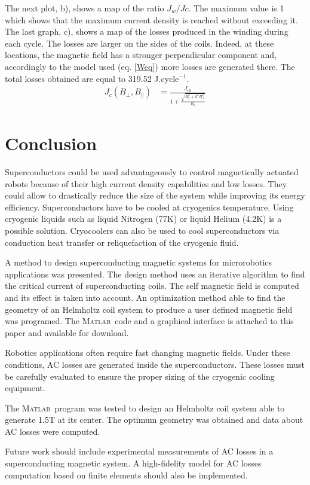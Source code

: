 \documentclass{ws-jmrr}
\newcommand{\MATLAB}{\textsc{Matlab}}
\begin{document}
\begin{multicols}{2}
\begin{figurehere}
\begin{center}
	\label{Results}
	\vspace{-0.5cm}
	\caption{Results from the geometric optimization of a superconducting Helmhotz coil system using the \MATLAB ~program provided with this paper.}
	\end{center}
\end{figurehere}
\vspace{-0.5cm}
The next plot, b), shows a map of the ratio $J_w/Jc$. The maximum value is 1 which shows that the maximum current density is reached without exceeding it. The last graph, c), shows a map of the losses produced in the winding during each cycle. The losses are larger on the sides of the coils. Indeed, at these locations, the magnetic field has a stronger perpendicular component and, accordingly to the model used (eq. \ref{Weq}) more losses are generated there. The total losses obtained are equal to 319.52 J.cycle$^{-1}$.
\begin{align}
J_c(B_{\perp},B_{\parallel})&=\frac{J_{c0}}{1+\frac{\sqrt{B_{\parallel}^2+k^2B_{\perp}^2}}{B_0}}
\label{model2}
\end{align}

\section{Conclusion}
Superconductors could be used advantageously to control magnetically actuated robots because of their high current density capabilities and low losses. They could allow to drastically reduce the size of the system while improving its energy efficiency. Superconductors have to be cooled at cryogenics temperature. Using cryogenic liquids such as liquid Nitrogen (77K) or liquid Helium (4.2K) is a possible solution. Cryocoolers can also be used to cool superconductors via conduction heat transfer or reliquefaction of the cryogenic fluid.\par 
A method to design superconducting magnetic systems for microrobotics applications was presented. The design method uses an iterative algorithm to find the critical current of superconducting coils. The self magnetic field is computed and its effect is taken into account. An optimization method able to find the geometry of an Helmholtz coil system to produce a user defined magnetic field was programed. The \MATLAB ~code and a graphical interface is attached to this paper and available for download.\par
Robotics applications often require fast changing magnetic fields. Under these conditions, AC losses are generated inside the superconductors. These losses must be carefully evaluated to ensure the proper sizing of the cryogenic cooling equipment.\par
The \MATLAB ~program was tested to design an Helmholtz coil system able to generate 1.5T at its center. The optimum geometry was obtained and data about AC losses were computed.\par
Future work should include experimental measurements of AC losses in a superconducting magnetic system. A high-fidelity model for AC losses computation based on finite elements should also be implemented.





\end{multicols} 
\end{document}
